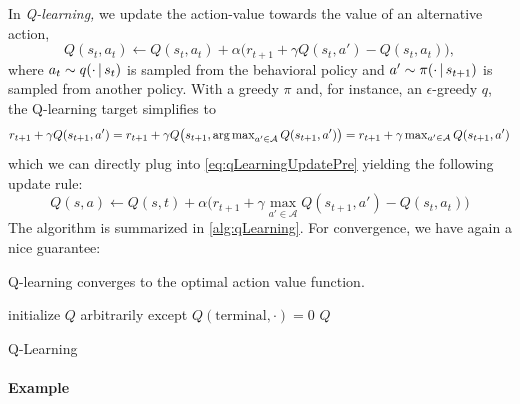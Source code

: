 			In \emph{Q-learning,} we update the action-value towards the value of an alternative action,
			\begin{equation}
				Q(s_t, a_t) \gets Q(s_t, a_t) + \alpha \bigl( r_{t + 1} + \gamma Q(s_t, a') - Q(s_t, a_t) \bigr),  \label{eq:qLearningUpdatePre}
			\end{equation}
			where \( a_t \sim q(\cdot \,\vert\, s_t) \) is sampled from the behavioral policy and \( a' \sim \pi(\cdot \,\vert\, s_{t + 1}) \) is sampled from another policy. With a greedy \(\pi\) and, for instance, an \(\epsilon\)-greedy \(q\), the Q-learning target simplifies to
			\begin{equation}
				r_{t + 1} + \gamma Q(s_{t + 1}, a')
					= r_{t + 1} + \gamma Q\bigl( s_{t + 1}, \textstyle\operatorname*{arg\,max}_{a' \in \mathcal{A}}\displaystyle Q(s_{t + 1}, a') \bigr)
					= r_{t + 1} + \gamma \textstyle\max_{a' \in \mathcal{A}}\displaystyle Q(s_{t + 1}, a')
			\end{equation}
			which we can directly plug into \eqref{eq:qLearningUpdatePre} yielding the following update rule:
			\begin{equation}
				Q(s, a) \gets Q(s, t) + \alpha \bigl( r_{t + 1} + \gamma \textstyle\max_{a' \in \mathcal{A}}\displaystyle Q(s_{t + 1}, a') - Q(s_t, a_t) \bigr)  \label{eq:tabularQLearning}
			\end{equation}
			The algorithm is summarized in \autoref{alg:qLearning}. For convergence, we have again a nice guarantee:
			\begin{theorem}
				Q-learning converges to the optimal action value function.
			\end{theorem}

			\begin{algorithm}  \DontPrintSemicolon
				initialize \(Q\) arbitrarily except \(Q(\mathrm{terminal}, \cdot) = 0\) \;
				\Return \(Q\) \;
				\caption{Q-Learning}
				\label{alg:qLearning}
			\end{algorithm}

			\paragraph{Example}

